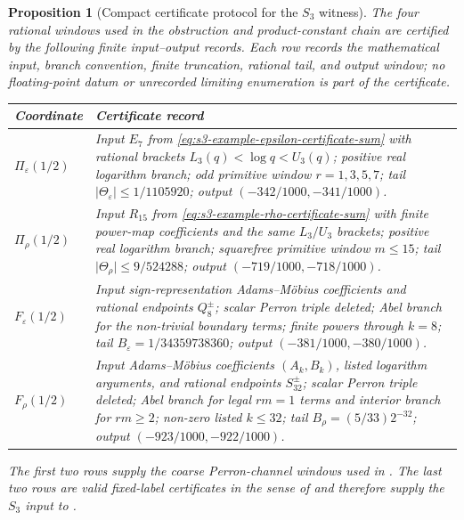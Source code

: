 \documentclass[11pt,a4paper]{amsart}
\theoremstyle{plain}
\newtheorem{proposition}[theorem]{Proposition}
\theoremstyle{definition}
\theoremstyle{remark}
\newcommand{\abs}[1]{\lvert #1 \rvert}
\begin{document}
\begin{proposition}[Compact certificate protocol for the \(S_3\) witness]
  \label{prop:s3-compact-certificate-protocol}
  The four rational windows used in the obstruction and product-constant chain
  are certified by the following finite input--output records.  Each row records
  the mathematical input, branch convention, finite truncation, rational tail,
  and output window; no floating-point datum or unrecorded limiting enumeration
  is part of the certificate.
  \begin{center}
  \begin{tabular}{L{0.18\textwidth}L{0.75\textwidth}}
    \toprule
    \textbf{Coordinate} & \textbf{Certificate record}\\
    \midrule
    \(\Pi_\varepsilon(1/2)\) &
      Input \(E_7\) from \eqref{eq:s3-example-epsilon-certificate-sum} with
      rational brackets \(L_3(q)<\log q<U_3(q)\); positive real logarithm
      branch; odd primitive window \(r=1,3,5,7\); tail
      \(\abs{\Theta_\varepsilon}\le1/1105920\); output
      \((-342/1000,-341/1000)\).\\[0.6ex]
    \(\Pi_\rho(1/2)\) &
      Input \(R_{15}\) from \eqref{eq:s3-example-rho-certificate-sum} with
      finite power-map coefficients and the same \(L_3/U_3\) brackets; positive
      real logarithm branch; squarefree primitive window \(m\le15\); tail
      \(\abs{\Theta_\rho}\le9/524288\); output
      \((-719/1000,-718/1000)\).\\[0.6ex]
    \(F_\varepsilon(1/2)\) &
      Input sign-representation Adams--M\"obius coefficients and rational
      endpoints \(Q_8^\pm\); scalar Perron triple deleted; Abel branch for the
      non-trivial boundary terms; finite powers through \(k=8\); tail
      \(B_\varepsilon=1/34359738360\); output
      \((-381/1000,-380/1000)\).\\[0.6ex]
    \(F_\rho(1/2)\) &
      Input Adams--M\"obius coefficients \((A_k,B_k)\), listed logarithm
      arguments, and rational endpoints \(S_{32}^\pm\); scalar Perron triple
      deleted; Abel branch for legal \(rm=1\) terms and interior branch for
      \(rm\ge2\); non-zero listed \(k\le32\); tail
      \(B_\rho=(5/33)2^{-32}\); output \((-923/1000,-922/1000)\).\\
    \bottomrule
  \end{tabular}
  \end{center}
  The first two rows supply the coarse Perron-channel windows used in
  .  The last two rows are valid
  fixed-label certificates in the sense of
  and therefore supply the \(S_3\) input to
  .
\end{proposition}
\end{document}
